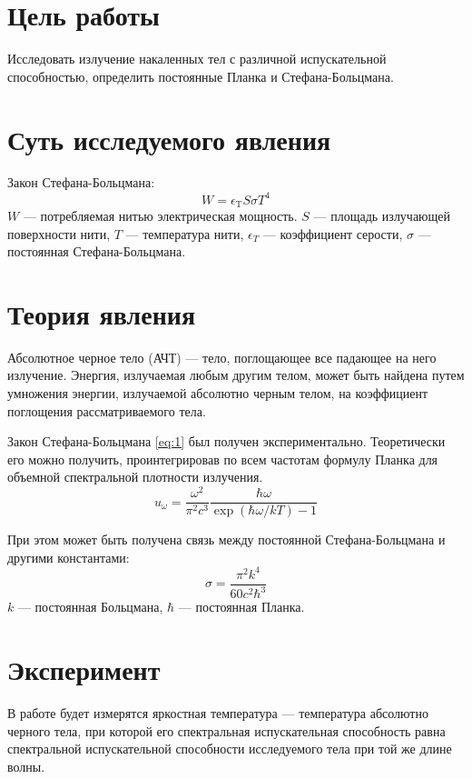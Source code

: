 \documentclass[a4paper, 12pt]{article}
\begin{document}

\section{Цель работы}
Исследовать излучение накаленных тел с различной испускательной
способностью, определить постоянные Планка и Стефана-Больцмана.

\section{Суть исследуемого явления}
Закон Стефана-Больцмана:
\begin{equation}
    W = \epsilon_\text{T} S \sigma T^4
    \label{eq:1}
\end{equation}
$W$ --- потребляемая нитью электрическая мощность. $S$ --- площадь
излучающей поверхности нити, $T$ --- температура нити, $\epsilon_T$
--- коэффициент серости, $\sigma$ --- постоянная Стефана-Больцмана. 


\section{Теория явления}
Абсолютное черное тело (АЧТ) --- тело, поглощающее все падающее на него
излучение. Энергия, излучаемая любым другим телом, может быть найдена
путем умножения энергии, излучаемой абсолютно черным телом, на
коэффициент поглощения рассматриваемого тела.

Закон Стефана-Больцмана \eqref{eq:1} был получен экспериментально.
Теоретически его можно получить, проинтегрировав по всем частотам
формулу Планка для объемной спектральной плотности излучения.
\begin{equation}
    u_\omega = \frac{\omega^2}{\pi^2 c^3} \frac{\hbar \omega}{\exp
    (\hbar \omega / kT) - 1}
    \label{eq:2}
\end{equation}

При этом может быть получена связь между постоянной Стефана-Больцмана
и другими константами:
\begin{equation}
    \sigma = \frac{\pi^2 k^4}{60 c^2 \hbar^3}
    \label{eq:3}
\end{equation}
$k$ --- постоянная Больцмана, $\hbar$ --- постоянная Планка.




\section{Эксперимент}
В работе будет измерятся яркостная температура --- температура
абсолютно черного тела, при которой его спектральная испускательная
способность равна спектральной испускательной способности исследуемого
тела при той же длине волны.
\end{document}
